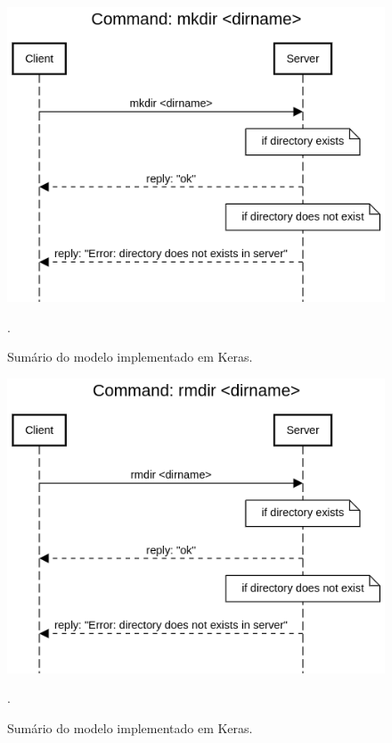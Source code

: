 \documentclass[conference]{IEEEtran}
\begin{document}
\begin{figure}[htbp]
\centering
\centerline{\includegraphics[scale=0.4]{diagrams/Command_mkdir_dirname.png}}
\caption{Sumário do modelo implementado em Keras.}.
\label{summary}
\end{figure}

\begin{figure}[htbp]
\centering
\centerline{\includegraphics[scale=0.4]{diagrams/Command_rmdir_dirname.png}}
\caption{Sumário do modelo implementado em Keras.}.
\label{summary}
\end{figure}
\end{document}
